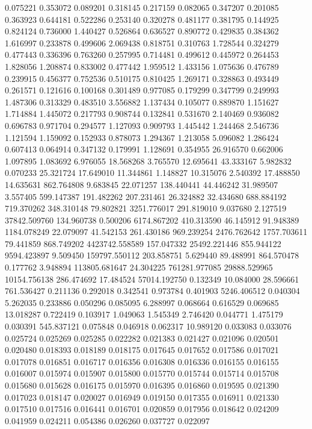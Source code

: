 0.075221
0.353072
0.089201
0.318145
0.217159
0.082065
0.347207
0.201085
0.363923
0.644181
0.522286
0.253140
0.320278
0.481177
0.381795
0.144925
0.824124
0.736000
1.440427
0.526864
0.636527
0.890772
0.429835
0.384362
1.616997
0.233878
0.499606
2.069438
0.818751
0.310763
1.728544
0.324279
0.477443
0.336396
0.763260
0.257995
0.714481
0.499612
0.445972
0.264453
1.828056
1.208874
0.833002
0.477442
1.959512
1.433156
1.075636
0.476789
0.239915
0.456377
0.752536
0.510175
0.810425
1.269171
0.328863
0.493449
0.261571
0.121616
0.100168
0.301489
0.977085
0.179299
0.347799
0.249993
1.487306
0.313329
0.483510
3.556882
1.137434
0.105077
0.889870
1.151627
1.714884
1.445072
0.217793
0.908744
0.132841
0.531670
2.140469
0.936082
0.696783
0.971704
0.294577
1.127093
0.909793
1.445442
1.244468
2.546736
1.121594
1.159092
0.152933
0.878073
1.294367
1.213058
5.096082
1.286424
0.607413
0.064914
0.347132
0.179991
1.128691
0.354955
26.916570
0.662006
1.097895
1.083692
6.976055
18.568268
3.765570
12.695641
43.333167
5.982832
0.070233
25.321724
17.649010
11.344861
1.148827
10.315076
2.540392
17.488850
14.635631
862.764808
9.683845
22.071257
138.440441
44.446242
31.989507
3.557405
599.147387
191.482262
207.231461
26.324882
32.434680
688.884192
719.370262
348.310148
79.802821
3251.776017
291.819010
9.037680
2.127519
37842.509760
134.960738
0.500206
6174.867202
410.313590
46.145912
91.948389
1184.078249
22.079097
41.542153
261.430186
969.239254
2476.762642
1757.703611
79.441859
868.749202
4423742.558589
157.047332
25492.221446
855.944122
9594.423897
9.509450
159797.550112
203.858751
5.629440
89.488991
864.570478
0.177762
3.948894
113805.681647
24.304225
761281.977085
29888.529965
10154.756138
286.474692
17.484524
57014.192750
0.132349
10.084000
28.596661
761.536427
0.211136
0.292018
0.342541
0.973784
0.401903
5246.406512
0.040304
5.262035
0.233886
0.050296
0.085095
6.288997
0.068664
0.616529
0.069685
13.018287
0.722419
0.103917
1.049063
1.545349
2.746420
0.044771
1.475179
0.030391
545.837121
0.075848
0.046918
0.062317
10.989120
0.033083
0.033076
0.025724
0.025269
0.025285
0.022282
0.021383
0.021427
0.021096
0.020501
0.020480
0.018393
0.018189
0.018175
0.017645
0.017652
0.017586
0.017021
0.017078
0.016851
0.016717
0.016356
0.016308
0.016336
0.016155
0.016155
0.016007
0.015974
0.015907
0.015800
0.015770
0.015744
0.015714
0.015708
0.015680
0.015628
0.016175
0.015970
0.016395
0.016860
0.019595
0.021390
0.017023
0.018147
0.020027
0.016949
0.019150
0.017355
0.016911
0.021330
0.017510
0.017516
0.016441
0.016701
0.020859
0.017956
0.018642
0.024209
0.041959
0.024211
0.054386
0.026260
0.037727
0.022097
